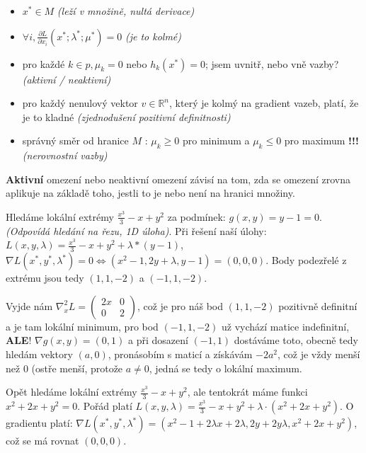 \begin{itemize}
    \item $x^* \in M$ \textit{(leží v množině, nultá derivace)}
    \item $\forall i, \frac{\partial L}{\partial x_i} (x^*;\lambda^*;\mu^*) = 0$ \textit{(je to kolmé)}
    \item pro každé $k \in p, \mu_k = 0$ nebo $h_k(x^*) = 0$; jsem uvnitř, nebo vně vazby? \textit{(aktivní / neaktivní)}
    \item pro každý nenulový vektor $v \in \mathbb{R}^n$, který je kolmý na gradient vazeb, platí, že je to kladné \textit{(zjednodušení pozitivní definitnosti)}
    \item správný směr od hranice $M$ : $\mu_k \geq 0$ pro minimum a $\mu_k \leq 0$ pro maximum \textbf{!!!} \textit{(nerovnostní vazby)}
\end{itemize}

\vspace{4pt}
\noindent \textbf{Aktivní} omezení nebo neaktivní omezení závisí na tom, zda se omezení zrovna aplikuje na základě toho, jestli to je nebo není na hranici množiny.


\vspace{12pt}
\noindent Hledáme lokální extrémy $\frac{x^3}{3} - x + y^2$ za podmínek: $g(x,y) = y - 1 = 0$. \textit{(Odpovídá hledání na řezu, 1D úloha)}. Při řešení naší úlohy: $L(x, y, \lambda) = \frac{x^3}{3} - x + y^2 + \lambda * (y - 1)$, $\nabla L(x^*, y^*, \lambda^*) = 0 \iff (x^2 - 1, 2y + \lambda, y - 1) = (0, 0, 0)$. Body podezřelé z extrému jsou tedy $(1,1,-2)$ a $(-1,1,-2)$.

\vspace{4pt}
\noindent Vyjde nám $\nabla^2_x L = \begin{pmatrix}
    2x & 0 \\
    0 & 2
\end{pmatrix}$, což je pro náš bod $(1,1,-2)$ pozitivně definitní a je tam lokální minimum, pro bod $(-1,1,-2)$ už vychází matice indefinitní, \textbf{ALE}! $\nabla g(x,y) = (0,1)$ a při dosazení $(-1,1)$ dostáváme toto, obecně tedy hledám vektory $(a,0)$, pronásobím s maticí a získávám $-2a^2$, což je vždy menší než 0 (ostře menší, protože $a \neq 0$, jedná se tedy o lokální maximum.

\vspace{12pt}
\noindent Opět hledáme lokální extrémy $\frac{x^3}{3} - x + y^2$, ale tentokrát máme funkci $x^2 + 2x + y^2 = 0$. Pořád platí $L(x, y, \lambda) = \frac{x^3}{3} - x + y^2 + \lambda \cdot (x^2 + 2x + y^2)$. O gradientu platí: $\nabla L(x^*, y^*, \lambda^*) = (x^2 - 1 + 2\lambda{}x + 2\lambda, 2y + 2y\lambda, x^2 + 2x + y^2)$, což se má rovnat $(0,0,0)$.

